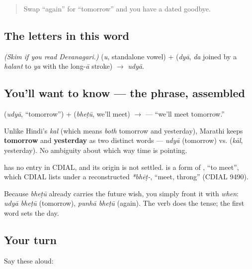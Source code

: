 \label{lesson:MR-C04-udya-bhetu}



\begin{quote}
Swap \textquotedblleft{}again\textquotedblright{} for \textquotedblleft{}tomorrow\textquotedblright{} and you have a dated goodbye.
\end{quote}

\subsection*{The letters in this word}
\emph{(Skim if you read Devanagari.)} \textbf{} (\emph{u}, standalone vowel) + \textbf{} (\emph{dyā},  \emph{da} joined by a \emph{halant} to  \emph{ya} with the long-\emph{ā} stroke) $\to$ \textbf{} \emph{udyā}.

\subsection*{You'll want to know — the phrase, assembled}
\textbf{} (\emph{udyā}, \textquotedblleft{}tomorrow\textquotedblright{}) + \textbf{} (\emph{bheṭū}, we'll meet) $\to$ \textbf{ } — \textquotedblleft{}we'll meet tomorrow.\textquotedblright{}

Unlike Hindi's \emph{kal} (which means \emph{both} tomorrow and yesterday), Marathi keeps \textbf{tomorrow} and \textbf{yesterday} as two distinct words — \emph{udyā} (tomorrow) vs. \textbf{} (\emph{kāl}, yesterday). No ambiguity about which way time is pointing.

\begin{cousinweb}
\textbf{} has no entry in CDIAL, and its origin is not settled. \textbf{} is a form of \textbf{}, \textquotedblleft{}to meet\textquotedblright{}, which CDIAL lists under a reconstructed \emph{*bhēṭ-}, \textquotedblleft{}meet, throng\textquotedblright{} (CDIAL 9490).
\end{cousinweb}

\begin{culture}
Because \emph{bheṭū} already carries the future wish, you simply front it with \emph{when}: \emph{udyā bheṭū} (tomorrow), \emph{punhā bheṭū} (again). The verb does the tense; the first word sets the day.
\end{culture}

\subsection*{Your turn}
Say these aloud:

